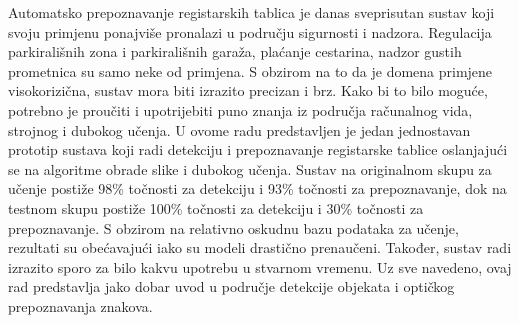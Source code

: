 \documentclass[times, utf8, diplomski]{fer}
\begin{document}
\begin{sazetak}
Automatsko prepoznavanje registarskih tablica je danas sveprisutan sustav koji svoju primjenu ponajviše pronalazi u području sigurnosti i nadzora. Regulacija parkirališnih zona i parkirališnih garaža, plaćanje cestarina, nadzor gustih prometnica su samo neke od primjena. S obzirom na to da je domena primjene visokorizična, sustav mora biti izrazito precizan i brz. Kako bi to bilo moguće, potrebno je proučiti i upotrijebiti puno znanja iz područja računalnog vida, strojnog i dubokog učenja. U ovome radu predstavljen je jedan jednostavan prototip sustava koji radi detekciju i prepoznavanje registarske tablice oslanjajući se na algoritme obrade slike i dubokog učenja. Sustav na originalnom skupu za učenje postiže 98\% točnosti za detekciju i 93\% točnosti za prepoznavanje, dok na testnom skupu postiže 100\% točnosti za detekciju i 30\% točnosti za prepoznavanje. S obzirom na relativno oskudnu bazu podataka za učenje, rezultati su obećavajući iako su modeli drastično prenaučeni. Također, sustav radi izrazito sporo za bilo kakvu upotrebu u stvarnom vremenu. Uz sve navedeno, ovaj rad predstavlja jako dobar uvod u područje detekcije objekata i optičkog prepoznavanja znakova.

\end{sazetak}

\newpage
\end{document}
